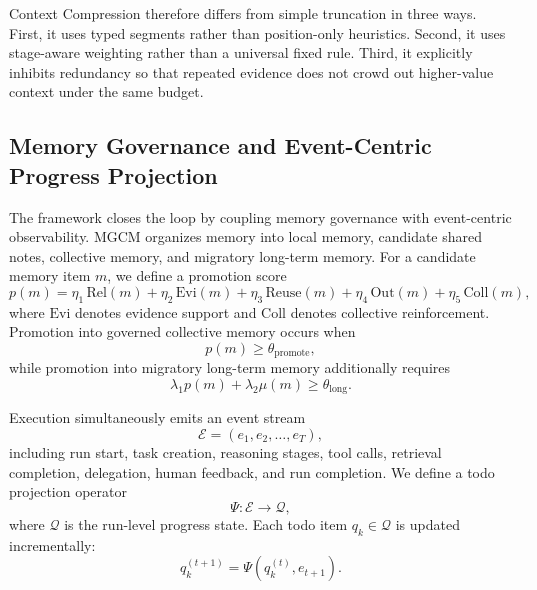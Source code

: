 \documentclass[a4paper,fleqn]{cas-sc}
\begin{document}
Context Compression therefore differs from simple truncation in three ways. First, it uses typed segments rather than position-only heuristics. Second, it uses stage-aware weighting rather than a universal fixed rule. Third, it explicitly inhibits redundancy so that repeated evidence does not crowd out higher-value context under the same budget.

\subsection{Memory Governance and Event-Centric Progress Projection}

The framework closes the loop by coupling memory governance with event-centric observability. MGCM organizes memory into local memory, candidate shared notes, collective memory, and migratory long-term memory. For a candidate memory item $m$, we define a promotion score
\begin{equation}
p(m) = \eta_1 \, \mathrm{Rel}(m) + \eta_2 \, \mathrm{Evi}(m) + \eta_3 \, \mathrm{Reuse}(m) + \eta_4 \, \mathrm{Out}(m) + \eta_5 \, \mathrm{Coll}(m),
\end{equation}
where $\mathrm{Evi}$ denotes evidence support and $\mathrm{Coll}$ denotes collective reinforcement. Promotion into governed collective memory occurs when
\begin{equation}
p(m) \geq \theta_{\text{promote}},
\end{equation}
while promotion into migratory long-term memory additionally requires
\begin{equation}
\lambda_1 p(m) + \lambda_2 \mu(m) \geq \theta_{\text{long}}.
\end{equation}

Execution simultaneously emits an event stream
\begin{equation}
\mathcal{E} = (e_1, e_2, \ldots, e_T),
\end{equation}
including run start, task creation, reasoning stages, tool calls, retrieval completion, delegation, human feedback, and run completion. We define a todo projection operator
\begin{equation}
\Psi : \mathcal{E} \rightarrow \mathcal{Q},
\end{equation}
where $\mathcal{Q}$ is the run-level progress state. Each todo item $q_k \in \mathcal{Q}$ is updated incrementally:
\begin{equation}
q_k^{(t+1)} = \Psi(q_k^{(t)}, e_{t+1}).
\end{equation}
\end{document}
